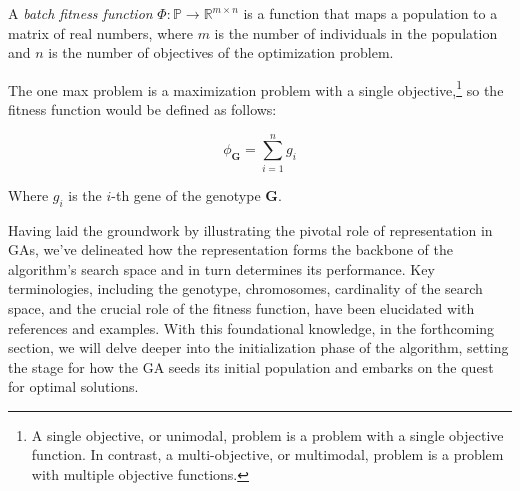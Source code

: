    \begin{definition}
    \label{def:batch_fitness_function}
        A \emph{batch fitness function} \(\Phi: \mathbb{P} \rightarrow \mathbb{R}^{m \times n}\) is a function that 
        maps a population to a matrix of real numbers, where \(m\) is the number of individuals in the population and 
        \(n\) is the number of objectives of the optimization problem.
    \end{definition}

    The one max problem is a maximization problem with a single objective,\footnote{
        A single objective, or unimodal, problem is a problem with a single objective function. In contrast, a 
        multi-objective, or multimodal, problem is a problem with multiple objective functions.
    } so the fitness function would be defined as follows:

    \begin{equation}
        \label{eq:fitness_function:one_max}
        \phi_\mathbf{G} = \sum_{i=1}^n g_i
    \end{equation}

    Where \(g_i\) is the \(i\)-th gene of the genotype \(\mathbf{G}\).

    Having laid the groundwork by illustrating the pivotal role of representation in GAs, we've delineated how the 
    representation forms the backbone of the algorithm's search space and in turn determines its performance. Key 
    terminologies, including the genotype, chromosomes, cardinality of the search space, and the crucial role of the 
    fitness function, have been elucidated with references and examples. With this foundational knowledge, in the 
    forthcoming section, we will delve deeper into the initialization phase of the algorithm, setting the stage for 
    how the GA seeds its initial population and embarks on the quest for optimal solutions.
    